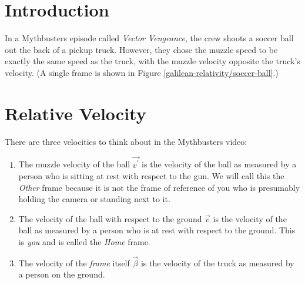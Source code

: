 
\section*{Introduction}

In a Mythbusters episode called \emph{Vector Vengeance}, the crew shoots a soccer ball out the back of a pickup truck. However, they chose the muzzle speed to be exactly the same speed as the truck, with the muzzle velocity opposite the truck's velocity. (A single frame is shown in Figure \ref{galilean-relativity/soccer-ball}.)





\section*{Relative Velocity}

There are three velocities to think about in the Mythbusters video:

\begin{enumerate}

\item The muzzle velocity of the ball $\vec{v^\prime}$ is the velocity of the ball as measured by a person who is sitting at rest with respect to the gun. We will call this the \emph{Other} frame because it is not the frame of reference of you who is presumably holding the camera or standing next to it.

\item The velocity of the ball with respect to the ground $\vec{v}$ is the velocity of the ball as measured by a person who is at rest with respect to the ground. This is \emph{you} and is called the \emph{Home} frame.

\item The velocity of the \emph{frame} itself $\vec{\beta}$ is the velocity of the truck as measured by a person on the ground.

\end{enumerate}


